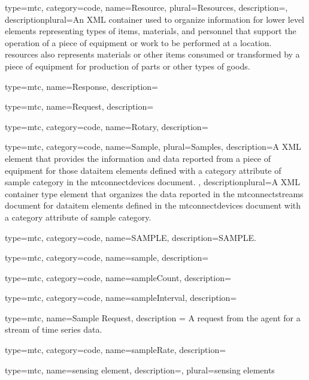 {
  type=mtc,
  category=code,
  name={Resource},
  plural={Resources},
  description={},
  descriptionplural={An XML container used to organize information for \gls{lower level} elements representing types of items, materials, and personnel that support the operation of a piece of equipment or work to be performed at a location. \glspl{resource} also represents materials or other items consumed or transformed by a piece of equipment for production of parts or other types of goods.}
}

{
  type=mtc,
  name={Response},
  description={}
}

{
  type=mtc,
  name={Request},
  description={}
}

{
  type=mtc,
  category=code,
  name={Rotary},
  description={}
}

{
  type=mtc,
  category=code,
  name={Sample},
  plural={Samples},
  description={A XML element that provides the information and data reported from a piece of equipment for those \gls{dataitem} elements defined with a \gls{category} attribute of \gls{sample category} in the \glspl{mtconnectdevice} document. },
  descriptionplural={A XML container type element that organizes the data reported in the \glspl{mtconnectstream} document for \gls{dataitem} elements defined in the \glspl{mtconnectdevice} document with a \gls{category} attribute of \gls{sample category}.}
}

{
  type=mtc,
  category=code,
  name={SAMPLE},
  description={SAMPLE.}
}

{
  type=mtc,
  category=code,
  name={sample},
  description={}
}

{
  type=mtc,
  category=code,
  name={sampleCount},
  description={}
}

{
  type=mtc,
  category=code,
  name={sampleInterval},
  description={}
}


{
  type=mtc,
  name={Sample Request},
  description = {A request from the \gls{agent} for a stream of time series data.}
}

{
  type=mtc,
  category=code,
  name={sampleRate},
  description={}
}

{
  type=mtc,
  name={sensing element},
  description={},
  plural={sensing elements}
}

